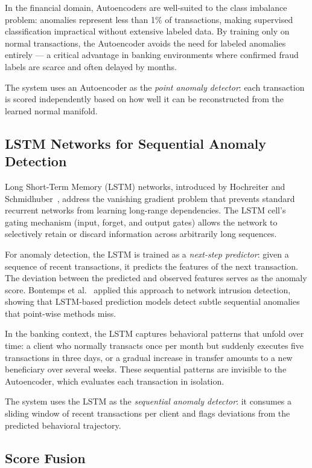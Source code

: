 In the financial domain, Autoencoders are well-suited to the class
imbalance problem: anomalies represent less than 1\% of transactions,
making supervised classification impractical without extensive labeled
data. By training only on normal transactions, the Autoencoder avoids
the need for labeled anomalies entirely --- a critical advantage in
banking environments where confirmed fraud labels are scarce and
often delayed by months.

The system uses an Autoencoder as the \textit{point anomaly detector}:
each transaction is scored independently based on how well it can be
reconstructed from the learned normal manifold.

\subsection{LSTM Networks for Sequential Anomaly Detection}

Long Short-Term Memory (LSTM) networks, introduced by Hochreiter and
Schmidhuber~\cite{hochreiter1997}, address the vanishing gradient
problem that prevents standard recurrent networks from learning
long-range dependencies. The LSTM cell's gating mechanism (input,
forget, and output gates) allows the network to selectively retain
or discard information across arbitrarily long sequences.

For anomaly detection, the LSTM is trained as a \textit{next-step
predictor}: given a sequence of recent transactions, it predicts the
features of the next transaction. The deviation between the predicted
and observed features serves as the anomaly score. Bontemps et
al.~\cite{bontemps2016} applied this approach to network intrusion
detection, showing that LSTM-based prediction models detect subtle
sequential anomalies that point-wise methods miss.

In the banking context, the LSTM captures behavioral patterns that
unfold over time: a client who normally transacts once per month but
suddenly executes five transactions in three days, or a gradual
increase in transfer amounts to a new beneficiary over several weeks.
These sequential patterns are invisible to the Autoencoder, which
evaluates each transaction in isolation.

The system uses the LSTM as the \textit{sequential anomaly detector}:
it consumes a sliding window of recent transactions per client and
flags deviations from the predicted behavioral trajectory.

\subsection{Score Fusion}

